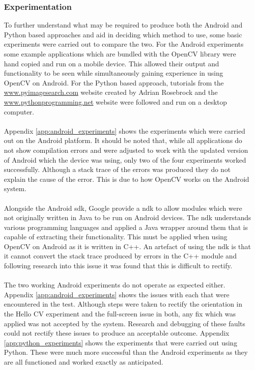 	\subsubsection{Experimentation}\label{sec:methodology_platform_experiments}
		To further understand what may be required to produce both the Android and Python based approaches and aid in deciding which method to use, some basic experiments were carried out to compare the two. For the Android experiments some example applications which are bundled with the OpenCV library were hand copied and run on a mobile device. This allowed their output and functionality to be seen while simultaneously gaining experience in using OpenCV on Android. For the Python based approach, tutorials from the \url{www.pyimagesearch.com} website created by Adrian Rosebrock \citep{pyimagesearch} and the \url{www.pythonprogramming.net} website \citep{pythonprogramming} were followed and run on a desktop computer.
		\\\\
		Appendix \ref{app:android_experiments} shows the experiments which were carried out on the Android platform. It should be noted that, while all applications do not show compilation errors and were adjusted to work with the updated version of Android which the device was using, only two of the four experiments worked successfully. Although a stack trace of the errors was produced they do not explain the cause of the error. This is due to how OpenCV works on the Android system.
		\\\\
		Alongside the Android \gls{sdk}, Google provide a \gls{ndk} to allow modules which were not originally written in Java to be run on Android devices. The \gls{ndk} understands various programming languages and applied a Java wrapper around them that is capable of extracting their functionality. This must be applied when using OpenCV on Android as it is written in C++. An artefact of using the \gls{ndk} is that it cannot convert the stack trace produced by errors in the C++ module and following research into this issue it was found that this is difficult to rectify.
		\\\\
		The two working Android experiments do not operate as expected either. Appendix \ref{app:android_experiments} shows the issues with each that were encountered in the test. Although steps were taken to rectify the orientation in the Hello CV experiment and the full-screen issue in both, any fix which was applied was not accepted by the system. Research and debugging of these faults could not rectify these issues to produce an acceptable outcome. Appendix \ref{app:python_experiments} shows the experiments that were carried out using Python. These were much more successful than the Android experiments as they are all functioned and worked exactly as anticipated.
